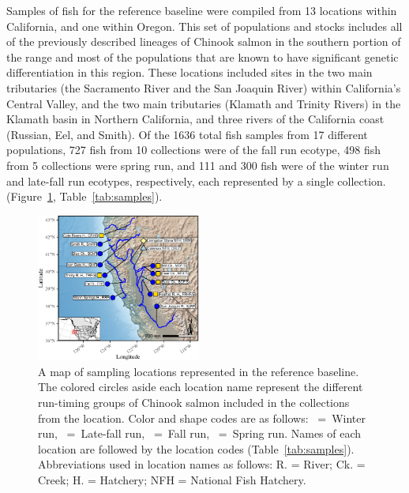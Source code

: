 Samples of fish for the reference baseline were compiled from 13 locations within California, and one
within Oregon. This set of populations and stocks includes all of the previously described lineages of Chinook salmon in the southern portion of the range and most of the populations that are known to have significant genetic differentiation in this region.
These locations included sites in the two
main tributaries (the Sacramento River and the San Joaquin River) within
California's Central Valley, and the two main tributaries (Klamath and Trinity Rivers) in the Klamath basin in Northern California, and
three rivers of the California coast (Russian, Eel, and Smith).
Of the 1636 total fish samples from 17 different populations, 727 fish from 10 collections were of the fall run ecotype,
498 fish from 5 collections were spring run, and 111 and 300 fish were of the winter run and late-fall run ecotypes, 
respectively,  each represented by a single collection.
(Figure~\ref{fig:map}, Table~\ref{tab:samples}).
\begin{figure}
\newcommand{\mapcap}{\footnotesize  A map of sampling locations represented in the reference
baseline.  The colored circles aside
each location name represent the different run-timing groups of Chinook salmon
included in the collections from the location.  Color and shape codes are as follows: \Wball~=~Winter run,
\LFball{}~=~Late-fall run, \Fball~=~Fall run, \Sball~=~Spring run.
Names of each location are followed by the location codes (Table~\ref{tab:samples}).
Abbreviations used in location names as follows:
R. = River; Ck. = Creek; H. = Hatchery; NFH = National Fish Hatchery.}
\begin{center}
\includegraphics[width=0.48\textwidth]{images/map-crop.pdf}
\end{center}
\caption[\mapcap]{\mapcap}
\label{fig:map}
\end{figure}


